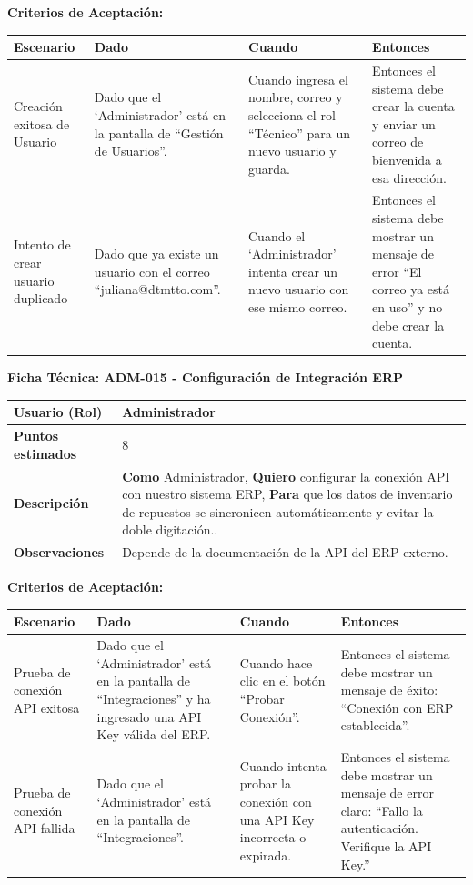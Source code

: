\noindent
\textbf{Criterios de Aceptación:}
\footnotesize
\begin{longtable}{|p{}|p{}|p{}|p{}|}
\hline
\textbf{Escenario} & \textbf{Dado} & \textbf{Cuando} & \textbf{Entonces} \\ \hline
\endhead
Creación exitosa de Usuario & Dado que el `Administrador' está en la pantalla de ``Gestión de Usuarios''. & Cuando ingresa el nombre, correo y selecciona el rol ``Técnico'' para un nuevo usuario y guarda. & Entonces el sistema debe crear la cuenta y enviar un correo de bienvenida a esa dirección. \\ \hline
Intento de crear usuario duplicado & Dado que ya existe un usuario con el correo ``juliana@dtmtto.com''. & Cuando el `Administrador' intenta crear un nuevo usuario con ese mismo correo. & Entonces el sistema debe mostrar un mensaje de error ``El correo ya está en uso'' y no debe crear la cuenta. \\ \hline
\end{longtable}
\normalsize

\noindent
\textbf{Ficha Técnica: ADM-015 - Configuración de Integración ERP}
\footnotesize
\begin{longtable}{|p{}|p{}|}
\hline
\textbf{Usuario (Rol)} & Administrador \\ \hline
\textbf{Puntos estimados} & 8 \\ \hline
\textbf{Descripción} & \textbf{Como} Administrador, \textbf{Quiero} configurar la conexión API con nuestro sistema ERP, \textbf{Para} que los datos de inventario de repuestos se sincronicen automáticamente y evitar la doble digitación.. \\ \hline
\textbf{Observaciones} & Depende de la documentación de la API del ERP externo. \\ \hline
\end{longtable}
\normalsize

\noindent
\textbf{Criterios de Aceptación:}
\footnotesize
\begin{longtable}{|p{}|p{}|p{}|p{}|}
\hline
\textbf{Escenario} & \textbf{Dado} & \textbf{Cuando} & \textbf{Entonces} \\ \hline
\endhead
Prueba de conexión API exitosa & Dado que el `Administrador' está en la pantalla de ``Integraciones'' y ha ingresado una API Key válida del ERP. & Cuando hace clic en el botón ``Probar Conexión''. & Entonces el sistema debe mostrar un mensaje de éxito: ``Conexión con ERP establecida''. \\ \hline
Prueba de conexión API fallida & Dado que el `Administrador' está en la pantalla de ``Integraciones''. & Cuando intenta probar la conexión con una API Key incorrecta o expirada. & Entonces el sistema debe mostrar un mensaje de error claro: ``Fallo la autenticación. Verifique la API Key.'' \\ \hline
\end{longtable}
\normalsize

